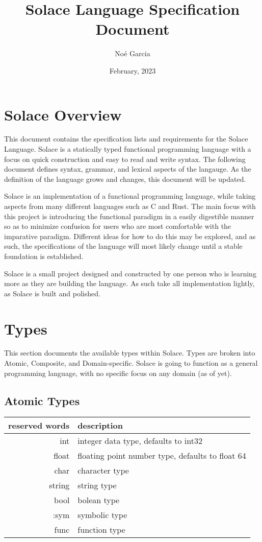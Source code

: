 \documentclass{article}
\title{
	\vspace{2in}
	\textmd{\textbf{Solace Language Specification Document}}
	\vspace{3in}
}
\author{No\'e Garcia}
\date{February, 2023}
\begin{document}
\maketitle
\newpage

\section{Solace Overview}
This document contains the specification lists and requirements for the Solace Language.
Solace is a statically typed functional programming language with a focus on quick
construction and easy to read and write syntax. The following document defines syntax,
grammar, and lexical aspects of the langauge. As the definition of the language grows
and changes, this document will be updated.

Solace is an implementation of a functional programming language,
while taking aspects from many different languages such as C and Rust.
The main focus with this project is introducing the functional paradigm in a easily
digestible manner so as to minimize confusion for users who are most comfortable with
the imparative paradigm. Different ideas for how to do this may be explored, and as
such, the specifications of the language will most likely change until a
stable foundation is established.

Solace is a small project designed and constructed by one person who is learning more
as they are building the language. As such take all implementation lightly,
as Solace is built and polished.


\section{Types}
This section documents the available types within Solace. Types are broken into Atomic,
Composite, and Domain-specific. Solace is going to function as a general programming language,
with no specific focus on any domain (as of yet).

\subsection{Atomic Types}
\begin{center}
\begin{tabular}{|r|l|}
	\hline
	reserved words & description \\
	\hline
	\hline
	int & integer data type, defaults to int32 \\
	float & floating point number type, defaults to float 64 \\
	char & character type \\
	string & string type \\
	bool & bolean type \\
	:sym & symbolic type \\
	func & function type \\
	\hline
\end{tabular}
\end{center}
\end{document}
